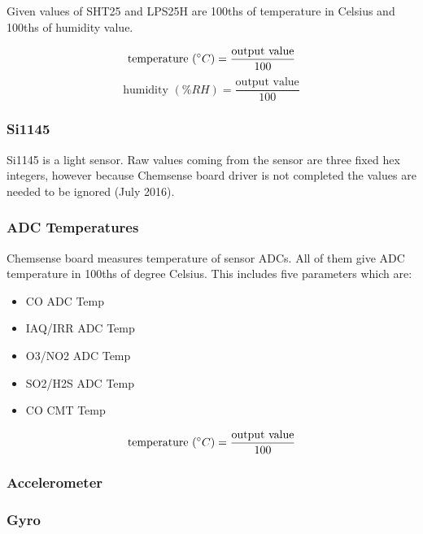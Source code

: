 Given values of SHT25 and LPS25H are 100ths of temperature in Celsius and 100ths of humidity value.

\bigbreak
{\centering
 \[ \text{temperature }(\degree C) = \frac{\text{output value}}{100} \]
 \[ \text{humidity }(\% RH) = \frac{\text{output value}}{100} \]
 \par
 }

% 
% 

\subsubsection{ Si1145}

Si1145 is a light sensor. Raw values coming from the sensor are three fixed hex integers, however because Chemsense board driver is not completed the values are needed to be ignored (July 2016).


\subsubsection{ ADC Temperatures}
Chemsense board measures temperature of sensor ADCs. All of them give ADC temperature in 100ths of degree Celsius. This includes five parameters which are:
 
\begin{itemize}
  \item CO ADC Temp
  \item IAQ/IRR ADC Temp
  \item O3/NO2 ADC Temp
  \item SO2/H2S ADC Temp
  \item CO CMT Temp
\end{itemize}


{\centering 
 \[ \text{temperature }(\degree C) = \frac{\text{output value}}{100} \]
}

\subsubsection{ Accelerometer}

\subsubsection{ Gyro}